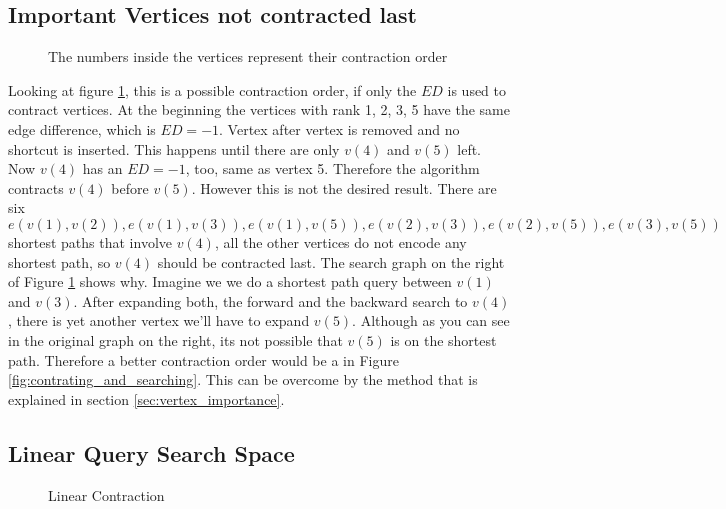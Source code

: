 \subsection{Important Vertices not contracted last}\label{sec:not_contracted_last}

\begin{figure}
    \centering
    
    \caption{The numbers inside the vertices represent their contraction order}
    \label{fig:not_contracted_last}
\end{figure}

Looking at figure \ref{fig:not_contracted_last}, this is a possible contraction order, if only the $ED$ is used to contract vertices. At the beginning the vertices with rank 1, 2, 3, 5 have the same edge difference, which is $ED = -1$. Vertex after vertex is removed  and  no shortcut is inserted. This happens until there are only $v(4)$ and $v(5)$ left. Now $v(4)$ has an $ED=-1$, too, same as vertex 5. Therefore the algorithm contracts $v(4)$ before $v(5)$. However this is not the desired result. There are six \\$e(v(1),v(2)), e(v(1),v(3)), e(v(1),v(5)), e(v(2),v(3)), e(v(2),v(5)), e(v(3),v(5))$  shortest paths that involve  $v(4)$, all the other vertices do not encode any shortest path, so $v(4)$ should be contracted last. The search graph on the right of Figure \ref{fig:not_contracted_last} shows why. Imagine we we do a shortest path query between $v(1)$ and $v(3)$. After expanding both, the forward and the backward search to $v(4)$, there is yet another vertex we'll have to expand $v(5)$. Although 
as you can see in the original graph on the right, its not possible that $v(5)$ is on the shortest path. Therefore a better contraction order would be a in Figure \ref{fig:contrating_and_searching}.  This can be overcome by the method that is explained in section \ref{sec:vertex_importance}.

\subsection{Linear Query Search Space}\label{sec:linear_query}

\begin{figure}
\centering

\caption{Linear Contraction}
\label{fig:linear_contraction}
\end{figure}

